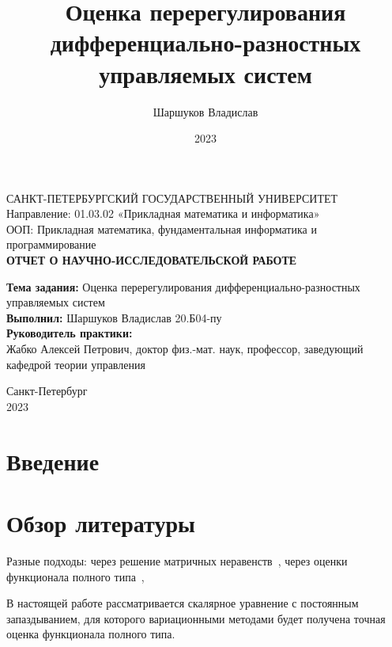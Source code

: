 \documentclass[a4paper,14pt]{article}
\title{Оценка перерегулирования дифференциально-разностных управляемых систем}
\author{Шаршуков Владислав}
\date{2023}
\theoremstyle{definition}
\begin{document}
\begin{titlepage}
  \begin{center}
    САНКТ-ПЕТЕРБУРГСКИЙ ГОСУДАРСТВЕННЫЙ УНИВЕРСИТЕТ \\
    Направление: 01.03.02 «Прикладная математика и информатика» \\
    ООП: Прикладная математика, фундаментальная информатика и программирование \\[4cm]

    \textbf{ОТЧЕТ О НАУЧНО-ИССЛЕДОВАТЕЛЬСКОЙ РАБОТЕ}\\
  \end{center}
  \textbf{Тема задания:} Оценка перерегулирования
  дифференциально-разностных управляемых систем \\[0.5cm]
  \textbf{Выполнил:} Шаршуков Владислав \qquad 20.Б04-пу \\ [1.5cm]
  \textbf{Руководитель практики:} \\Жабко Алексей Петрович,
  доктор физ.-мат. наук, профессор, заведующий кафедрой теории
  управления
  \vspace{5cm}
  \begin{center}
    Санкт-Петербург\\
    2023
  \end{center}
\end{titlepage}

\setcounter{page}{2}

\begin{center}
  \tableofcontents
\end{center}

\newpage

\section{Введение}

\section{Обзор литературы}

Разные подходы: через решение матричных неравенств~\cite{modie2005},
через оценки функционала полного типа~\cite{kharitonov2013, kharitonov2004},

В настоящей работе рассматривается скалярное уравнение с постоянным
запаздыванием, для которого вариационными методами будет получена
точная оценка функционала полного типа.
\end{document}
